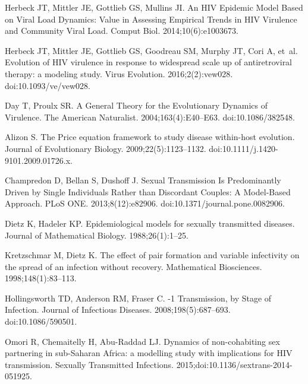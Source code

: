 \documentclass[10pt,letterpaper]{article}
\begin{document}
\begin{thebibliography}{10}
Herbeck JT, Mittler JE, Gottlieb GS, Mullins JI.
\newblock An {HIV} Epidemic Model Based on Viral Load Dynamics: Value in
  Assessing Empirical Trends in {HIV} Virulence and Community Viral Load.
 Comput Biol. 2014;10(6):e1003673.

Herbeck JT, Mittler JE, Gottlieb GS, Goodreau SM, Murphy JT, Cori A, et~al.
\newblock Evolution of {HIV} virulence in response to widespread scale up of
  antiretroviral therapy: a modeling study.
\newblock Virus Evolution. 2016;2(2):vew028.
\newblock doi:{10.1093/ve/vew028}.

Day T, Proulx SR.
\newblock A General Theory for the Evolutionary Dynamics of Virulence.
\newblock The American Naturalist. 2004;163(4):E40--E63.
\newblock doi:{10.1086/382548}.

Alizon S.
\newblock The {Price} equation framework to study disease within-host
  evolution.
\newblock Journal of Evolutionary Biology. 2009;22(5):1123--1132.
\newblock doi:{10.1111/j.1420-9101.2009.01726.x}.

Champredon D, Bellan S, Dushoff J.
 Sexual Transmission Is Predominantly Driven by Single
  Individuals Rather than Discordant Couples: A Model-Based Approach.
\newblock PLoS ONE. 2013;8(12):e82906.
\newblock doi:{10.1371/journal.pone.0082906}.

Dietz K, Hadeler KP.
\newblock Epidemiological models for sexually transmitted diseases.
\newblock Journal of Mathematical Biology. 1988;26(1):1--25.

Kretzschmar M, Dietz K.
\newblock The effect of pair formation and variable infectivity on the spread
  of an infection without recovery.
\newblock Mathematical Biosciences. 1998;148(1):83--113.

Hollingsworth TD, Anderson RM, Fraser C.
-1 Transmission, by Stage of Infection.
\newblock Journal of Infectious Diseases. 2008;198(5):687--693.
\newblock doi:{10.1086/590501}.

Omori R, Chemaitelly H, Abu-Raddad LJ.
\newblock Dynamics of non-cohabiting sex partnering in sub-{Saharan} {Africa}:
  a modelling study with implications for {HIV} transmission.
\newblock Sexually Transmitted Infections.
  2015;doi:{10.1136/sextrans-2014-051925}.


\end{thebibliography}
\end{document}
